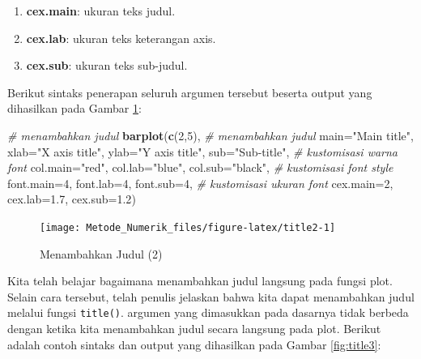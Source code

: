 \documentclass[
]{book}
\newenvironment{Shaded}{\begin{snugshade}}{\end{snugshade}}
\newcommand{\AttributeTok}[1]{\textcolor[rgb]{0.13,0.29,0.53}{#1}}
\newcommand{\CommentTok}[1]{\textcolor[rgb]{0.56,0.35,0.01}{\textit{#1}}}
\newcommand{\DecValTok}[1]{\textcolor[rgb]{0.00,0.00,0.81}{#1}}
\newcommand{\FloatTok}[1]{\textcolor[rgb]{0.00,0.00,0.81}{#1}}
\newcommand{\FunctionTok}[1]{\textcolor[rgb]{0.13,0.29,0.53}{\textbf{#1}}}
\newcommand{\NormalTok}[1]{#1}
\newcommand{\StringTok}[1]{\textcolor[rgb]{0.31,0.60,0.02}{#1}}
\providecommand{\tightlist}{%
  \setlength{\itemsep}{0pt}\setlength{\parskip}{0pt}}
\theoremstyle{definition}
\theoremstyle{definition}
\theoremstyle{definition}
\theoremstyle{definition}
\theoremstyle{remark}
\begin{document}
\begin{enumerate}
\def\labelenumi{\alph{enumi}.}
\tightlist
\item
  \textbf{cex.main}: ukuran teks judul.
\item
  \textbf{cex.lab}: ukuran teks keterangan axis.
\item
  \textbf{cex.sub}: ukuran teks sub-judul.
\end{enumerate}

Berikut sintaks penerapan seluruh argumen tersebut beserta output yang dihasilkan pada Gambar \ref{fig:title2}:

\begin{Shaded}
\begin{Highlighting}[]
\CommentTok{\# menambahkan judul}
\FunctionTok{barplot}\NormalTok{(}\FunctionTok{c}\NormalTok{(}\DecValTok{2}\NormalTok{,}\DecValTok{5}\NormalTok{), }
        \CommentTok{\# menambahkan judul}
        \AttributeTok{main=}\StringTok{"Main title"}\NormalTok{,}
        \AttributeTok{xlab=}\StringTok{"X axis title"}\NormalTok{,}
        \AttributeTok{ylab=}\StringTok{"Y axis title"}\NormalTok{,}
        \AttributeTok{sub=}\StringTok{"Sub{-}title"}\NormalTok{,}
        \CommentTok{\# kustomisasi warna font}
        \AttributeTok{col.main=}\StringTok{"red"}\NormalTok{, }
        \AttributeTok{col.lab=}\StringTok{"blue"}\NormalTok{, }
        \AttributeTok{col.sub=}\StringTok{"black"}\NormalTok{,}
        \CommentTok{\# kustomisasi font style}
        \AttributeTok{font.main=}\DecValTok{4}\NormalTok{, }
        \AttributeTok{font.lab=}\DecValTok{4}\NormalTok{, }
        \AttributeTok{font.sub=}\DecValTok{4}\NormalTok{,}
        \CommentTok{\# kustomisasi ukuran font}
        \AttributeTok{cex.main=}\DecValTok{2}\NormalTok{, }
        \AttributeTok{cex.lab=}\FloatTok{1.7}\NormalTok{, }
        \AttributeTok{cex.sub=}\FloatTok{1.2}\NormalTok{)}
\end{Highlighting}
\end{Shaded}

\begin{figure}

{\centering \texttt{[image: Metode\_Numerik\_files/figure-latex/title2-1]} 

}

\caption{Menambahkan Judul (2)}\label{fig:title2}
\end{figure}

Kita telah belajar bagaimana menambahkan judul langsung pada fungsi plot. Selain cara tersebut, telah penulis jelaskan bahwa kita dapat menambahkan judul melalui fungsi \texttt{title()}. argumen yang dimasukkan pada dasarnya tidak berbeda dengan ketika kita menambahkan judul secara langsung pada plot. Berikut adalah contoh sintaks dan output yang dihasilkan pada Gambar \ref{fig:title3}:
\end{document}

